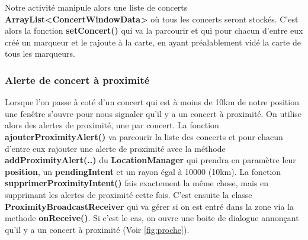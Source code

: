\documentclass{article}
\begin{document}
Notre activité manipule alors une liste de concerts \textbf{ArrayList<ConcertWindowData>} où tous les concerts seront stockés. C'est alors la fonction \textbf{setConcert()} qui va la parcourir  et qui pour chacun d'entre eux créé un marqueur et le rajoute à la carte, en ayant préalablement vidé la carte de tous les marqueurs.

\subsubsection{Alerte de concert à proximité}

Lorsque l'on passe à coté d'un concert qui est à moins de 10km de notre position une fenêtre s'ouvre pour nous signaler qu'il y a un concert à proximité. 
On utilise alors des alertes de proximité, une par concert. 
La fonction \textbf{ajouterProximityAlert()} va parcourir la liste des concerts et pour chacun d'entre eux rajouter une alerte de proximité avec la méthode \textbf{addProximityAlert(..)} du \textbf{LocationManager} qui prendra en paramètre leur \textbf{position}, un \textbf{pendingIntent} et un rayon égal à 10000 (10km). La fonction \textbf{supprimerProximityIntent()} fais exactement la même chose, mais en supprimant les alertes de proximité cette fois. 
C'est ensuite la classe \textbf{ProximityBroadcastReceiver} qui va gérer si on est entré dans la zone via la methode \textbf{onReceive()}. Si c'est le cas, on ouvre une boite de dialogue annonçant qu'il y a un concert à proximité (Voir \ref{fig:proche}). 
\end{document}
